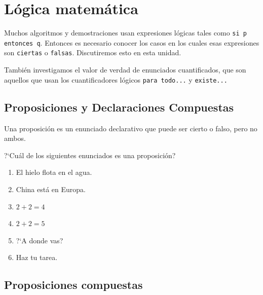 \section{Lógica matemática}


    Muchos algoritmos y demostraciones usan expresiones lógicas tales como
    \texttt{si p entonces q}. Entonces es necesario conocer los casos en los cuales esas expresiones son \texttt{ciertas} o \texttt{falsas}. Discutiremos esto en esta unidad. 

    Tambi\'en investigamos el valor de verdad de enunciados cuantificados, que son aquellos que usan los cuantificadores lógicos \texttt{para todo...} y \texttt{existe...}


\subsection{Proposiciones y Declaraciones Compuestas}

    Una proposición es un enunciado declarativo que puede ser cierto o falso, pero no ambos. 

    \begin{ejemplo}
        ?`Cuál de los siguientes enunciados es una proposición?
        \begin{multicols}{2}
            \begin{enumerate}
                \item El hielo flota en el agua.
                \item China está en Europa.
                \item $2+2=4$
                \item $2+2=5$
                \item ?`A donde vas?
                \item Haz tu tarea.
            \end{enumerate}
        \end{multicols}
    \end{ejemplo}
    


\subsection{Proposiciones compuestas}


